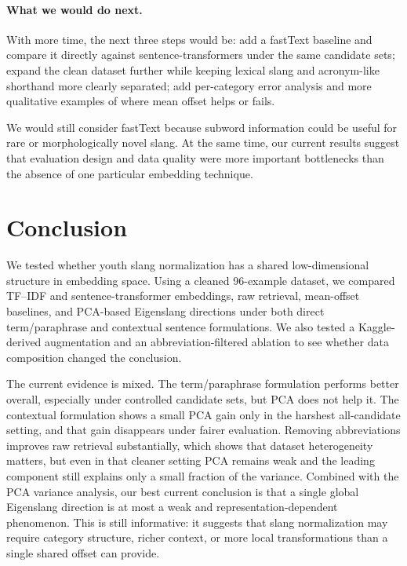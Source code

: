 \documentclass{article}
\begin{document}
\paragraph{What we would do next.}

With more time, the next three steps would be: add a fastText baseline and compare it directly against sentence-transformers under the same candidate sets; expand the clean dataset further while keeping lexical slang and acronym-like shorthand more clearly separated; add per-category error analysis and more qualitative examples of where mean offset helps or fails.

We would still consider fastText because subword information could be useful for rare or morphologically novel slang.
At the same time, our current results suggest that evaluation design and data quality were more important bottlenecks than the absence of one particular embedding technique.

\section{Conclusion}
We tested whether youth slang normalization has a shared low-dimensional structure in embedding space.
Using a cleaned 96-example dataset, we compared TF--IDF and sentence-transformer embeddings, raw retrieval, mean-offset baselines, and PCA-based Eigenslang directions under both direct term/paraphrase and contextual sentence formulations.
We also tested a Kaggle-derived augmentation and an abbreviation-filtered ablation to see whether data composition changed the conclusion.

The current evidence is mixed.
The term/paraphrase formulation performs better overall, especially under controlled candidate sets, but PCA does not help it.
The contextual formulation shows a small PCA gain only in the harshest all-candidate setting, and that gain disappears under fairer evaluation.
Removing abbreviations improves raw retrieval substantially, which shows that dataset heterogeneity matters, but even in that cleaner setting PCA remains weak and the leading component still explains only a small fraction of the variance.
Combined with the PCA variance analysis, our best current conclusion is that a single global Eigenslang direction is at most a weak and representation-dependent phenomenon.
This is still informative: it suggests that slang normalization may require category structure, richer context, or more local transformations than a single shared offset can provide.
\end{document}
